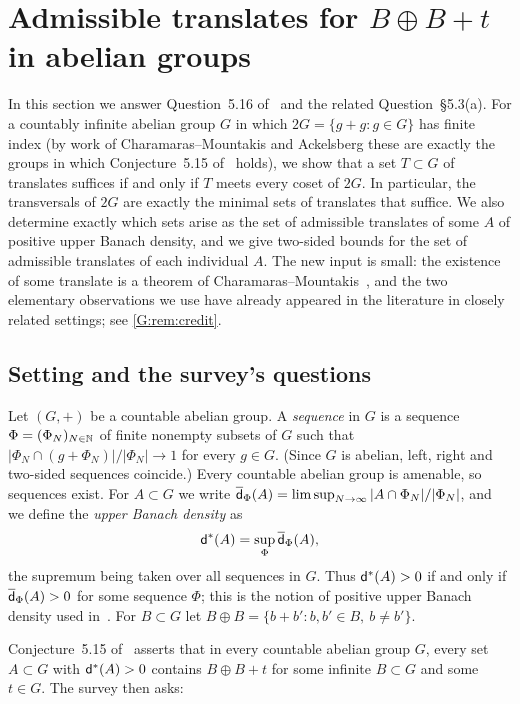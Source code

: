 \section{Admissible translates for \texorpdfstring{$B\oplus B+t$}{B⊕B+t} in abelian groups}
\label{G:sec:translates}

In this section we answer Question~5.16 of~\cite{kra2023problems} and the related
Question~\S5.3(a). For a countably infinite abelian group $G$ in which $2G=\{g+g:g\in G\}$
has finite index (by work of Charamaras--Mountakis and Ackelsberg these are exactly the
groups in which Conjecture~5.15 of~\cite{kra2023problems} holds), we show that a set
$T\subset G$ of translates suffices if and only if $T$ meets every coset of $2G$. In
particular, the transversals of $2G$ are exactly the minimal sets of translates that
suffice. We also determine exactly which sets arise as the set of admissible translates
of some $A$ of positive upper Banach density, and we give two-sided bounds for the set of
admissible translates of each individual $A$.
The new input is small: the existence of some translate is a theorem of
Charamaras--Mountakis~\cite{charamaras2024finding}, and the two elementary observations
we use have already appeared in the literature in closely related settings; see
\cref{G:rem:credit}.

\subsection{Setting and the survey's questions}
Let $(G,+)$ be a countable abelian group. A \emph{\Fol{} sequence} in $G$ is a sequence
$\Phi=(\Phi_N)_{N\in\mathbb{N}}$ of finite nonempty subsets of $G$ such that
$|\Phi_N\cap(g+\Phi_N)|/|\Phi_N|\to1$ for every $g\in G$. (Since $G$ is abelian, left,
right and two-sided \Fol{} sequences coincide.) Every countable abelian group is amenable,
so \Fol{} sequences exist. For $A\subset G$ we write
$\overline{\mathsf{d}}_\Phi(A)=\limsup_{N\to\infty}|A\cap\Phi_N|/|\Phi_N|$, and we define the
\emph{upper Banach density} as
\[
\mathsf{d}^*(A)=\sup_\Phi\overline{\mathsf{d}}_\Phi(A),
\]
the supremum being taken over all \Fol{} sequences in $G$. Thus $\mathsf{d}^*(A)>0$ if and only if
$\overline{\mathsf{d}}_\Phi(A)>0$ for some \Fol{} sequence $\Phi$; this is the notion of positive upper
Banach density used in~\cite{charamaras2024finding}. For $B\subset G$ let
$B\oplus B=\{b+b':b,b'\in B,\ b\neq b'\}$.

Conjecture~5.15 of~\cite{kra2023problems} asserts that in every countable abelian group
$G$, every set $A\subset G$ with $\mathsf{d}^*(A)>0$ contains $B\oplus B+t$ for some infinite
$B\subset G$ and some $t\in G$. The survey then asks:

